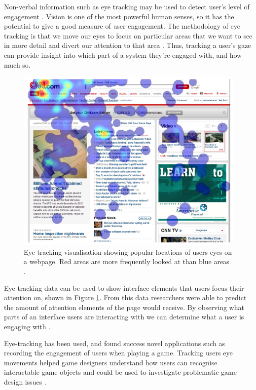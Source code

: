 \documentclass{article}
\begin{document}
Non-verbal information such as eye tracking may be used to detect user's level of engagement \cite{lala2017detection}.
Vision is one of the most powerful human senses, so it has the potential to give a good measure of user engagement. 
The methodology of eye tracking is that we move our eyes to focus on particular areas that we want to see in more detail and divert our attention to that area \cite{duchowski2007eye}. 
Thus, tracking a user's gaze can provide insight into which part of a system they're engaged with, and how much so.

\begin{figure}[ht!]
    \centering
    \centerline{
        \includegraphics[scale=0.6]{Images/EyeHeatmap.PNG}
    }
    \caption{Eye tracking visualisation showing popular locations of users eyes on a webpage. Red areas are more frequently looked at than blue areas \cite{buscher2009you}.}
    \label{fig:eyetrack}
\end{figure}

Eye tracking data can be used to show interface elements that users focus their attention on, shown in Figure \ref{fig:eyetrack}. 
From this data researchers were able to predict the amount of attention elements of the page would receive.
By observing what parts of an interface users are interacting with we can determine what a user is engaging with \cite{buscher2009you}.

Eye-tracking has been used, and found success novel applications such as recording the engagement of users when playing a game. 
Tracking users eye movements helped game designers understand how users can recognise interactable game objects and could be used to investigate problematic game design issues \cite{renshaw2009towards}.
\end{document}
